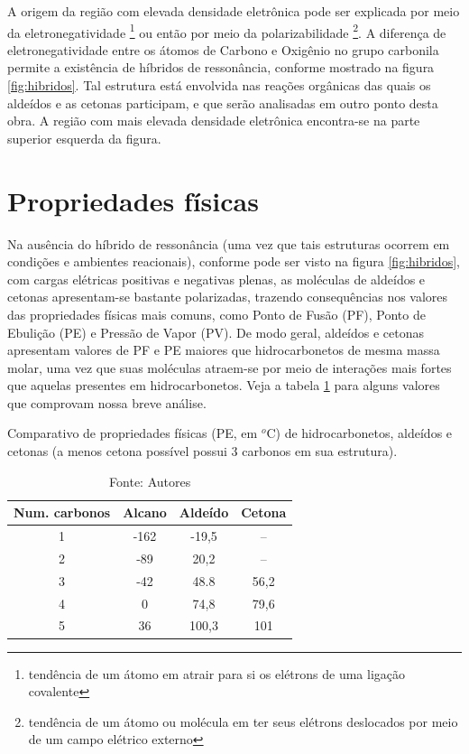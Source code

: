 A origem da região com elevada densidade eletrônica pode ser explicada por meio da eletronegatividade \footnote{tendência de um átomo em atrair para si os elétrons de uma ligação covalente} ou então por meio da polarizabilidade \footnote{tendência de um átomo ou molécula em ter seus elétrons deslocados por meio de um campo elétrico externo}. A diferença de eletronegatividade entre os átomos de Carbono e Oxigênio no grupo carbonila permite a existência de híbridos de ressonância, conforme mostrado na figura \ref{fig:hibridos}. Tal estrutura está envolvida nas reações orgânicas das quais os aldeídos e as cetonas participam, e que serão analisadas em outro ponto desta obra. A região com mais elevada densidade eletrônica encontra-se na parte superior esquerda da figura.

\section{Propriedades físicas}
Na ausência do híbrido de ressonância (uma vez que tais estruturas ocorrem em condições e ambientes reacionais), conforme pode ser visto na figura \ref{fig:hibridos}, com cargas elétricas positivas e negativas plenas, as moléculas de aldeídos e cetonas apresentam-se bastante polarizadas, trazendo consequências nos valores das propriedades físicas mais comuns, como Ponto de Fusão (PF), Ponto de Ebulição (PE) e Pressão de Vapor (PV). De modo geral, aldeídos e cetonas apresentam valores de PF e PE maiores que hidrocarbonetos de mesma massa molar, uma vez que suas moléculas atraem-se por meio de interações mais fortes que aquelas presentes em hidrocarbonetos. Veja a tabela \ref{pfalcanos} para alguns valores que comprovam nossa breve análise.

\vspace{0.5cm}
\begin{table}[!h]
	\begin{center}
	\caption{\label{pfalcanos}Comparativo de propriedades físicas (PE, em $^o$C) de hidrocarbonetos, aldeídos e cetonas (a menos cetona possível possui 3 carbonos em sua estrutura).}
	\vspace{0.5cm}
	\begin{tabular}{c c c c}
	\hline
	Num. carbonos & Alcano & Aldeído & Cetona\\
	\hline
	1 & -162 & -19,5 & -- \\
	2 & -89 & 20,2 & -- \\
	3 & -42 & 48.8 & 56,2 \\
	4 & 0 & 74,8 & 79,6 \\
	5 & 36 & 100,3 & 101 \\
	\hline
	\end{tabular}
	\end{center}
	\caption*{Fonte: Autores}
\end{table}

